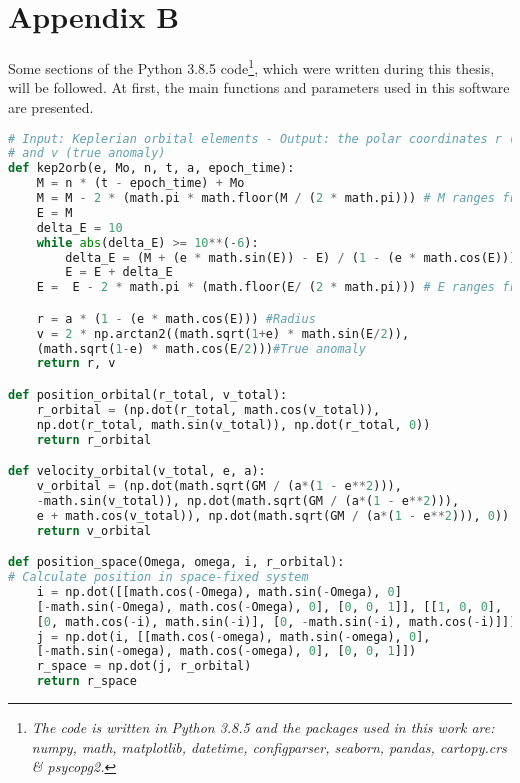 \documentclass[12pt,a4paper,notitlepage,oneside,openright]{report}
\begin{document}
\newpage
\chapter*{Appendix B}
\label{appB}
Some sections of the Python 3.8.5 code\footnote{\label{Python_packages}\textit{The code is written in Python 3.8.5 and the packages used in this work are: numpy, math, matplotlib, datetime, configparser, seaborn, pandas, cartopy.crs \& psycopg2.}}, which were written during this thesis, will be followed. At first, the main functions and parameters used in this software are presented.

\begin{center}
\begin{lstlisting}[language=Python, formfeed=\newpage, extendedchars=true]
# Input: Keplerian orbital elements - Output: the polar coordinates r (radius)
# and v (true anomaly)
def kep2orb(e, Mo, n, t, a, epoch_time):
    M = n * (t - epoch_time) + Mo
    M = M - 2 * (math.pi * math.floor(M / (2 * math.pi))) # M ranges from [0-2pi]
    E = M
    delta_E = 10
    while abs(delta_E) >= 10**(-6):
        delta_E = (M + (e * math.sin(E)) - E) / (1 - (e * math.cos(E)))
        E = E + delta_E
    E =  E - 2 * math.pi * (math.floor(E/ (2 * math.pi))) # E ranges from [0-2pi]

    r = a * (1 - (e * math.cos(E))) #Radius
    v = 2 * np.arctan2((math.sqrt(1+e) * math.sin(E/2)),
    (math.sqrt(1-e) * math.cos(E/2)))#True anomaly
    return r, v

def position_orbital(r_total, v_total): 
    r_orbital = (np.dot(r_total, math.cos(v_total)),
    np.dot(r_total, math.sin(v_total)), np.dot(r_total, 0))
    return r_orbital

def velocity_orbital(v_total, e, a):
    v_orbital = (np.dot(math.sqrt(GM / (a*(1 - e**2))),
    -math.sin(v_total)), np.dot(math.sqrt(GM / (a*(1 - e**2))),
    e + math.cos(v_total)), np.dot(math.sqrt(GM / (a*(1 - e**2))), 0))
    return v_orbital

def position_space(Omega, omega, i, r_orbital):
# Calculate position in space-fixed system
    i = np.dot([[math.cos(-Omega), math.sin(-Omega), 0]
    [-math.sin(-Omega), math.cos(-Omega), 0], [0, 0, 1]], [[1, 0, 0],
    [0, math.cos(-i), math.sin(-i)], [0, -math.sin(-i), math.cos(-i)]])
    j = np.dot(i, [[math.cos(-omega), math.sin(-omega), 0],
    [-math.sin(-omega), math.cos(-omega), 0], [0, 0, 1]])
    r_space = np.dot(j, r_orbital)
    return r_space


\end{lstlisting}
\end{center}
\end{document}
